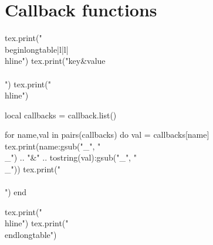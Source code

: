\documentclass{article}
\begin{document}
\section*{Callback functions}

\begin{luacode*}
tex.print("\\begin{longtable}{|l|l|}\\hline")
tex.print("key&value\\\\")
tex.print("\\hline")

local callbacks = callback.list()

for name,val in pairs(callbacks) do
    val = callbacks[name]
    tex.print(name:gsub("_", "\\_") .. "&" .. tostring(val):gsub("_", "\\_"))
    tex.print("\\\\")
end

tex.print("\\hline")
tex.print("\\end{longtable}")
\end{luacode*}
\end{document}
